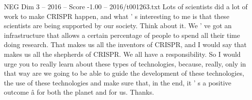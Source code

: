 \begin{textsample}{NEG Dim 3 – 2016 – Score -1.00 – 2016/t001263.txt}
Lots of scientists did a lot of work to make CRISPR happen, and what ' s interesting to me is that these scientists are being supported by our society.
Think about it.
We ' ve got an infrastructure that allows a certain percentage of people to spend all their time doing research.
That makes us all the inventors of CRISPR, and I would say that makes us all the shepherds of CRISPR.
We all have a responsibility.
So I would urge you to really learn about these types of technologies, because, really, only in that way are we going to be able to guide the development of these technologies, the use of these technologies and make sure that, in the end, it ' s a positive outcome â for both the planet and for us.
Thanks.

\end{textsample}
